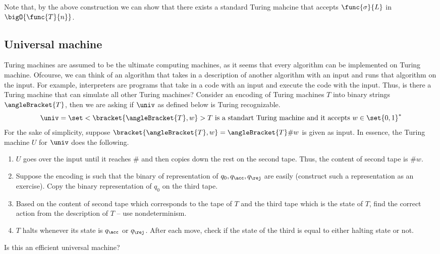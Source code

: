 \begin{remark}
    Note that, by the above construction we can show that there exists a standard Turing mahcine that accepts \(\func{\sigma}{L}\) in \(\bigO{\func{T}{n}}\).
\end{remark}

\subsection{Universal machine}
Turing machines are assumed to be the ultimate computing machines, as it seems that every algorithm can be implemented on Turing machine. Ofcourse, we can think of an algorithm that takes in a description of another algorithm with an input and runs that algorithm on the input. For example, interpreters are programs that take in a code with an input and execute the code with the input. Thus, is there a Turing machine that can simulate all other Turing machines? Consider an encoding of Turing machines \(T\) into binary strings \(\angleBracket{T}\), then we are asking if \(\univ\) as defined below is Turing recognizable.
\begin{equation*}
    \univ = \set< \bracket{\angleBracket{T},w}>{ T \text{ is a standart Turing machine and it accepts } w \in \set{0,1}^{\ast}}
\end{equation*}
For the sake of simplicity, suppose \(\bracket{\angleBracket{T},w} = \angleBracket{T} \# w\) is given as input. In essence, the Turing machine \(U\) for \(\univ\) does the following.

\begin{enumerate}
    \item \(U\) goes over the input until it reaches \(\#\) and then copies down the rest on the second tape. Thus, the content of second tape is \(\#w\).
    \item Suppose the encoding is such that the binary of representation of \(q_0,q_{\acc}, q_{\rej}\) are easily (construct such a representation as an exercise). Copy the binary representation of \(q_0\) on the third tape. 
    \item Based on the content of second tape which corresponds to the tape of \(T\) and the third tape which is the state of \(T\), find the correct action from the description of \(T\) -- use nondeterminism. 
    \item \(T\) halts whenever its state is \(q_{\acc}\) or \(q_{\rej}\). After each move, check if the state of the third is equal to either halting state or not.
\end{enumerate}
Is this an efficient universal machine?


